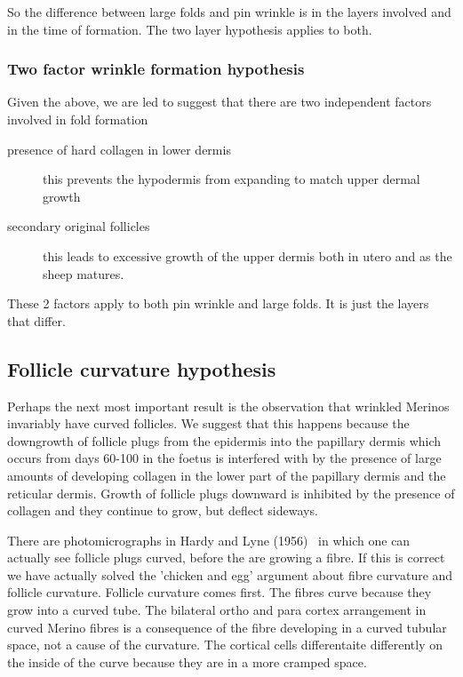 \documentclass[titlepage]{article}  %
\begin{document}
So the difference between large folds and pin wrinkle is in the layers involved and in the time of formation. The two layer hypothesis applies to both.

\subsubsection{Two factor wrinkle formation hypothesis}
Given the above, we are led to suggest that there are two independent factors involved in fold formation
\begin{description}
\item[presence of hard collagen in lower dermis] this prevents the hypodermis from expanding to match upper dermal growth
\item[secondary original follicles] this leads to excessive growth of the upper dermis both in utero and as the sheep matures.
\end{description}

These 2 factors apply to both pin wrinkle and large folds. It is just the layers that differ.
 
\subsection{Follicle curvature hypothesis}
Perhaps the next most important result is the observation that wrinkled Merinos invariably have curved follicles. We suggest that this happens because the downgrowth of follicle plugs from the epidermis into the papillary dermis which occurs from days 60-100 in the foetus is interfered with by the presence of large amounts of developing collagen in the lower part of the papillary dermis and the reticular dermis. Growth of follicle plugs downward is inhibited by the presence of collagen and they continue to grow, but deflect sideways.

There are photomicrographs in Hardy and Lyne (1956)~\cite{hard:56} in which one can actually see follicle plugs curved, before the are growing a fibre. If this is correct we have actually solved the 'chicken and egg' argument about fibre curvature and follicle curvature. Follicle curvature comes first. The fibres curve because they grow into a curved tube. The bilateral ortho and para cortex arrangement in curved Merino fibres is a consequence of the fibre developing in a curved tubular space, not a cause of the curvature. The cortical cells differentaite differently on the inside of the curve because they are in a more cramped space.
\end{document}
